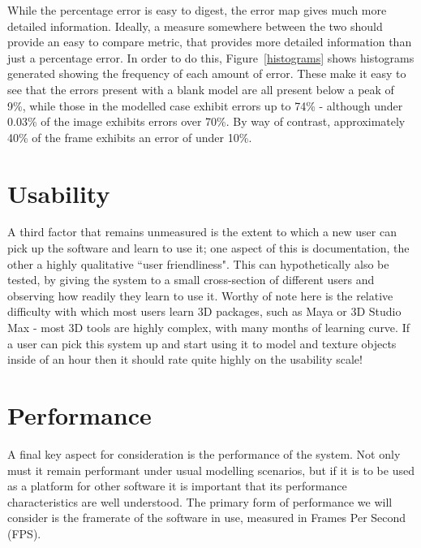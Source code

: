 \documentclass[a4paper,10pt]{report}
\begin{document}
While the percentage error is easy to digest, the error map gives much more detailed information. Ideally, a measure somewhere between the two should provide an easy to compare metric, that provides more detailed information than just a percentage error. In order to do this, Figure~\ref{histograms} shows histograms generated showing the frequency of each amount of error. These make it easy to see that the errors present with a blank model are all present below a peak of 9\%, while those in the modelled case exhibit errors up to 74\% - although under 0.03\% of the image exhibits errors over 70\%. By way of contrast, approximately 40\% of the frame exhibits an error of under 10\%.


\section{Usability}
A third factor that remains unmeasured is the extent to which a new user can pick up the software and learn to use it; one aspect of this is documentation, the other a highly qualitative ``user friendliness". This can hypothetically also be tested, by giving the system to a small cross-section of different users and observing how readily they learn to use it. Worthy of note here is the relative difficulty with which most users learn 3D packages, such as Maya or 3D Studio Max - most 3D tools are highly complex, with many months of learning curve. If a user can pick this system up and start using it to model and texture objects inside of an hour then it should rate quite highly on the usability scale!

\section{Performance}
A final key aspect for consideration is the performance of the system. Not only must it remain performant under usual modelling scenarios, but if it is to be used as a platform for other software it is important that its performance characteristics are well understood. The primary form of performance we will consider is the framerate of the software in use, measured in Frames Per Second (FPS). 
\end{document}
